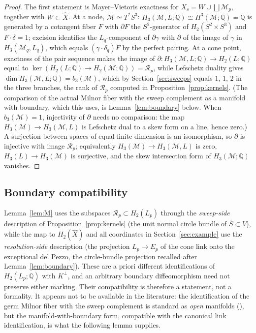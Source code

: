 \documentclass[11pt]{amsart}
\theoremstyle{definition}
\theoremstyle{remark}
\theoremstyle{plain}
\newcommand{\QQ}{\mathbb{Q}}
\newcommand{\Rsm}{\mathcal{R}}   %
\newcommand{\Mil}{\mathcal{M}}  %
\newcommand{\Xh}{\widehat{X}}
\newcommand{\Sb}{\bar{S}}
\begin{document}
\begin{proof}
The first statement is Mayer--Vietoris exactness for
$X_s=W\cup\bigsqcup \Mil_p$, together with $W\subset\Xh$.  At a node,
$\Mil\simeq T^*S^3$: $H_3(\Mil,L;\QQ)\cong H^3(\Mil;\QQ)=\QQ$ is generated by
a cotangent fiber $F$ with $\partial F$ the $S^2$-generator of
$H_2(S^2\times S^3)$ and $F\cdot\delta=1$; excision identifies the
$L_q$-component of $\partial\gamma$ with
$\partial$ of the image of $\gamma$ in $H_3(\Mil_q,L_q)$, which equals
$(\gamma\cdot\delta_q)F$ by the perfect pairing.  At a cone point, exactness of the pair sequence makes the image of
$\partial\colon H_3(\Mil,L;\QQ)\to H_2(L;\QQ)$ equal to
$\ker(H_2(L;\QQ)\to H_2(\Mil;\QQ))=\Rsm_p$, while Lefschetz duality gives
$\dim H_3(\Mil,L;\QQ)=b_3(\Mil)$, which by Section~\ref{sec:sweeps} equals
$1$, $1$, $2$ in the three branches, the rank of $\Rsm_p$ computed in
Proposition~\ref{prop:kernels}.  (The comparison of the actual Milnor fiber
with the sweep complement as a manifold with boundary, which this uses, is
Lemma~\ref{lem:boundary} below.  When $b_3(\Mil)=1$, injectivity of
$\partial$ needs no comparison: the map $H_3(\Mil)\to H_3(\Mil,L)$ is
Lefschetz dual to a skew form on a line, hence zero.)  A surjection between
spaces of equal finite dimension is an isomorphism, so $\partial$ is
injective with image $\Rsm_p$; equivalently $H_3(\Mil)\to H_3(\Mil,L)$ is
zero, $H_3(L)\to H_3(\Mil)$ is surjective, and the skew intersection form of
$H_3(\Mil;\QQ)$ vanishes.
\end{proof}

\subsection{Boundary compatibility}\label{sec:boundary}
Lemma~\ref{lem:M} uses the subspaces
$\Rsm_p\subset H_2(L_p)$ through the \emph{sweep-side} description of
Proposition~\ref{prop:kernels} (the unit normal circle bundle of
$\Sb\subset V$), while the map to $H_2(\Xh)$ and all coordinates in
Section~\ref{sec:example} use the \emph{resolution-side} description
(the projection $L_p\to E_p$ of the cone link onto the exceptional del Pezzo,
the circle-bundle projection recalled after Lemma~\ref{lem:boundary}).  These are a
priori different identifications of $H_2(L_p;\QQ)$ with
$K^{\perp}$, and an arbitrary boundary diffeomorphism need not preserve
either marking.  Their compatibility is therefore a statement, not a
formality.  It appears not to be available in the literature:
the identification of the germ Milnor fiber with the sweep complement
is standard as \emph{open} manifolds
(\cite[Proposition~4.2]{PP15}), but the manifold-with-boundary form,
compatible with the canonical link identification, is what the
following lemma supplies.
\end{document}
